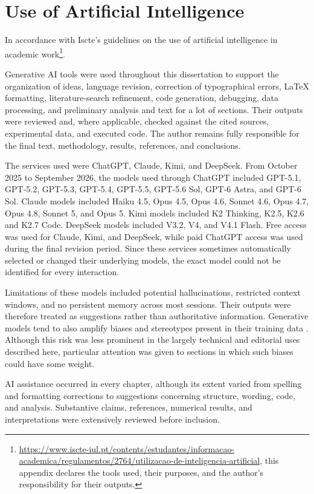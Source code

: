 

\chapter{Use of Artificial Intelligence}\label{appendix:ai_usage}

In accordance with Iscte's guidelines on the use of artificial intelligence in academic work\footnote{\url{https://www.iscte-iul.pt/contents/estudantes/informacao-academica/regulamentos/2764/utilizacao-de-inteligencia-artificial}, this appendix declares the tools used, their purposes, and the author's responsibility for their outputs.}.

Generative AI tools were used throughout this dissertation to support the organization of ideas, language revision, correction of typographical errors, \LaTeX{} formatting, literature-search refinement, code generation, debugging, data processing, and preliminary analysis and text for a lot of sections. Their outputs were reviewed and, where applicable, checked against the cited sources, experimental data, and executed code. The author remains fully responsible for the final text, methodology, results, references, and conclusions.

The services used were ChatGPT, Claude, Kimi, and DeepSeek. From October 2025 to September 2026, the models used through ChatGPT included GPT-5.1, GPT-5.2, GPT-5.3, GPT-5.4, GPT-5.5, GPT-5.6 Sol, GPT-6 Astra, and GPT-6 Sol. Claude models included Haiku 4.5, Opus 4.5, Opus 4.6, Sonnet 4.6, Opus 4.7, Opus 4.8, Sonnet 5, and Opus 5. Kimi models included K2 Thinking, K2.5, K2.6 and K2.7 Code. DeepSeek models included V3.2, V4, and V4.1 Flash. Free access was used for Claude, Kimi, and DeepSeek, while paid ChatGPT access was used during the final revision period. Since these services sometimes automatically selected or changed their underlying models, the exact model could not be identified for every interaction.

Limitations of these models included potential hallucinations, restricted context windows, and no persistent memory across most sessions. Their outputs were therefore treated as suggestions rather than authoritative information. Generative models tend to also amplify biases and stereotypes present in their training data \cite{bolukbasi2016man,seshadri-etal-2024-bias}. Although this risk was less prominent in the largely technical and editorial uses described here, particular attention was given to sections in which such biases could have some weight.

AI assistance occurred in every chapter, although its extent varied from spelling and formatting corrections to suggestions concerning structure, wording, code, and analysis. Substantive claims, references, numerical results, and interpretations were extensively reviewed before inclusion.

